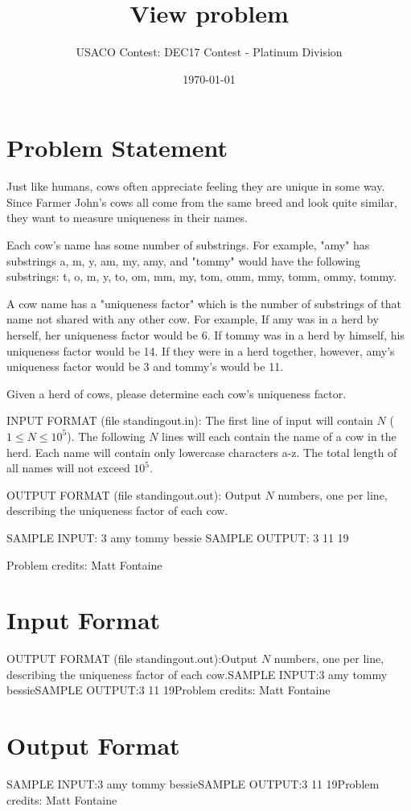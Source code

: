 \documentclass[12pt]{article}
\title{View problem}
\author{USACO Contest: DEC17 Contest - Platinum Division}
\date{\today}
\begin{document}
\maketitle

\section*{Problem Statement}

Just like humans, cows often appreciate feeling they are unique in some way.
Since Farmer John's cows all come from the same breed and look quite similar,
they want to measure uniqueness in their names.  

Each cow's name has some number of substrings. For example, "amy" has substrings
{a, m, y, am, my, amy}, and "tommy" would have the following substrings: {t, o,
m, y, to, om, mm, my, tom, omm, mmy, tomm, ommy, tommy}.

A cow name has a "uniqueness factor" which is the number of substrings of that
name not shared with any other cow.  For example,   If amy was in a herd by
herself, her uniqueness factor would be 6. If tommy was in a herd by himself,
his uniqueness factor would be 14. If they were in a herd together, however,
amy's uniqueness factor would be 3 and tommy's would be 11.

Given a herd of cows, please determine each cow's uniqueness factor.

INPUT FORMAT (file standingout.in):
The first line of input will contain $N$ ($1 \le N \le 10^5$). The following $N$
lines will each contain the name of a cow in the herd. Each name will contain
only lowercase characters a-z. The total length of all names will not exceed
$10^5$.

OUTPUT FORMAT (file standingout.out):
Output $N$ numbers, one per line, describing the uniqueness factor of each
cow.

SAMPLE INPUT:
3
amy
tommy
bessie
SAMPLE OUTPUT: 
3
11
19


Problem credits: Matt Fontaine



\section*{Input Format}
OUTPUT FORMAT (file standingout.out):Output $N$ numbers, one per line, describing the uniqueness factor of each
cow.SAMPLE INPUT:3
amy
tommy
bessieSAMPLE OUTPUT:3
11
19Problem credits: Matt Fontaine

\section*{Output Format}
SAMPLE INPUT:3
amy
tommy
bessieSAMPLE OUTPUT:3
11
19Problem credits: Matt Fontaine
\end{document}
